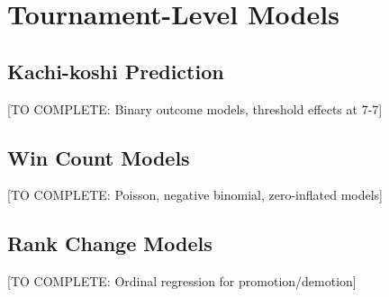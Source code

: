 \section{Tournament-Level Models}

\subsection{Kachi-koshi Prediction}

[TO COMPLETE: Binary outcome models, threshold effects at 7-7]

\subsection{Win Count Models}

[TO COMPLETE: Poisson, negative binomial, zero-inflated models]

\subsection{Rank Change Models}

[TO COMPLETE: Ordinal regression for promotion/demotion]